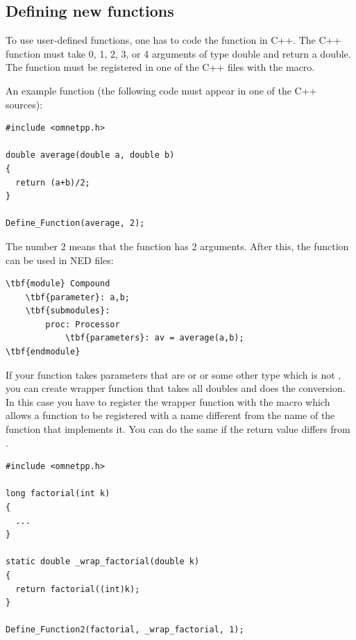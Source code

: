 \subsection{Defining new functions}
\label{sec:ch-ned-lang:defining-functions}

To use user-defined functions, one has
to code the function in C++.  The C++ function must take 0, 1, 2, 3, or 4
arguments of type double and return a double. The function must be
registered in one of the C++ files with the 
macro.

An example function (the following code must appear in one of the C++
sources):


\begin{verbatim}
#include <omnetpp.h>

double average(double a, double b)
{
  return (a+b)/2;
}

Define_Function(average, 2);
\end{verbatim}


The number 2 means that the  function has 2
arguments.  After this, the  function can be used in
NED files:


\begin{Verbatim}[commandchars=\\\{\}]
\tbf{module} Compound
    \tbf{parameter}: a,b;
    \tbf{submodules}:
        proc: Processor
            \tbf{parameters}: av = average(a,b);
\tbf{endmodule}
\end{Verbatim}


If your function takes parameters that are  or  or
some other type which is not , you can create wrapper function
that takes all doubles and does the conversion. In this case you have
to register the wrapper function with the  macro
which allows a function to be registered with a name different from the
name of the function that implements it. You can do the same
if the return value differs from .

\begin{verbatim}
#include <omnetpp.h>

long factorial(int k)
{
  ...
}

static double _wrap_factorial(double k)
{
  return factorial((int)k);
}

Define_Function2(factorial, _wrap_factorial, 1);
\end{verbatim}



